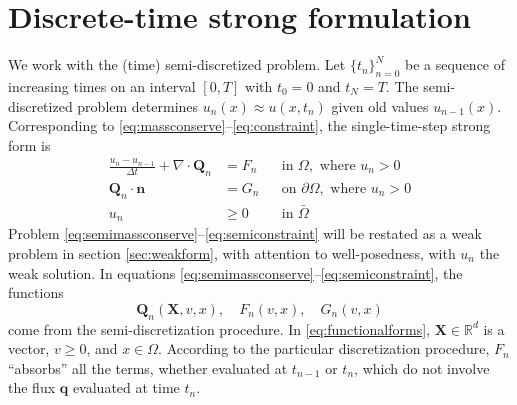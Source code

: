 \documentclass[final,leqno,onefignum,onetabnum]{siamltex1213bueler}
\newcommand\bn{\mathbf{n}}
\newcommand\bq{\mathbf{q}}
\newcommand\bQ{\mathbf{Q}}
\newcommand\bX{\mathbf{X}}
\newcommand{\Div}{\nabla\cdot}
\newcommand\RR{\mathbb{R}}
\begin{document}
\section{Discrete-time strong formulation}  \label{sec:discreteform}

We work with the (time) semi-discretized problem.  Let $\{t_n\}_{n=0}^N$ be a sequence of increasing times on an interval $[0,T]$ with $t_0=0$ and $t_N=T$.  The semi-discretized problem determines $u_n(x) \approx u(x,t_n)$ given old values $u_{n-1}(x)$.  Corresponding to \eqref{eq:massconserve}--\eqref{eq:constraint}, the single-time-step strong form is
\begin{align}
\frac{u_n - u_{n-1}}{\Delta t} + \Div \bQ_n &= F_n &&\text{in } \Omega, \text{ where } u_n > 0 \label{eq:semimassconserve} \\
\bQ_n \cdot \bn &= G_n &&\text{on } \partial\Omega, \text{ where } u_n > 0 \label{eq:semifixedneumann} \\
u_n &\ge 0 &&\text{in } \bar\Omega \label{eq:semiconstraint}
\end{align}
Problem \eqref{eq:semimassconserve}--\eqref{eq:semiconstraint} will be restated as a weak problem in section \ref{sec:weakform}, with attention to well-posedness, with $u_n$ the weak solution.  In equations \eqref{eq:semimassconserve}--\eqref{eq:semiconstraint}, the functions
\begin{equation}
\bQ_n(\bX,v,x), \quad F_n(v,x), \quad G_n(v,x)\label{eq:functionalforms}
\end{equation}
come from the semi-discretization procedure.  In \eqref{eq:functionalforms}, $\bX\in\RR^d$ is a vector, $v\ge 0$, and $x\in \Omega$.  According to the particular discretization procedure, $F_n$ ``absorbs'' all the terms, whether evaluated at $t_{n-1}$ or $t_n$, which do not involve the flux $\bq$ evaluated at time $t_n$.
\end{document}
